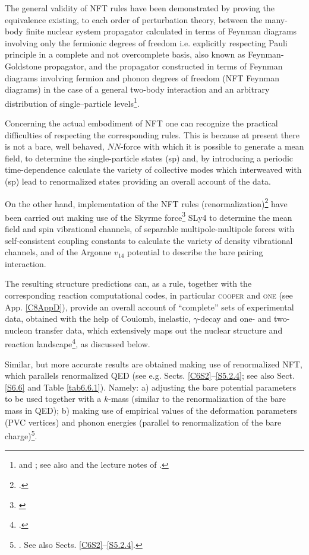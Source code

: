 The general validity of NFT rules have been demonstrated by proving the equivalence existing, to each order of perturbation theory, between the many-body finite nuclear system propagator calculated in terms of Feynman diagrams involving only the fermionic degrees of freedom i.e. explicitly respecting Pauli principle in a complete and not overcomplete basis, also known as Feynman-Goldstone propagator, and the propagator constructed in terms of Feynman diagrams involving fermion and phonon degrees of freedom (NFT Feynman diagrams) in the case of a general two-body interaction and an arbitrary distribution of single--particle levels\footnote{\cite{Bes:75} and \cite{Bes:76c}; see also \cite{Baranger:69} and the  lecture notes of  \cite{McFarlane:69}.}.



 Concerning the actual embodiment of NFT one can recognize the practical difficulties of respecting the corresponding rules. This is because at present there is not a  bare, well behaved, $NN$-force  with which it is possible to generate a mean field,  to determine the single-particle states (sp)  and, by introducing a periodic time-dependence calculate the variety of collective modes which interweaved with (sp) lead to renormalized states providing an overall account of the data. 



On the other hand,  implementation of the NFT rules (renormalization)\footnote{\cite{Broglia:16}.} have been carried out making use of the Skyrme  force\footnote{\cite{Chabanat:97}} SLy4 to determine the mean field and spin vibrational channels,  of separable multipole-multipole forces with self-consistent  coupling constants to calculate the variety of density vibrational channels, and of the  Argonne $v_{14}$ potential to describe the bare pairing interaction.


The resulting structure predictions can, as a rule,  together with the corresponding reaction computational codes, in particular \textsc{cooper} and \textsc{one} (see App. \ref{C8AppD}), provide an overall account of ``complete'' sets of experimental data, obtained with the help of Coulomb, inelastic, $\gamma$-decay  and one- and two-nucleon transfer data, which  extensively maps out the nuclear structure and reaction landscape\footnote{\cite{Idini:15,Idini:14,Potel:13}.}, as discussed below.


 Similar, but more accurate results are obtained  making use of renormalized NFT, which parallels renormalized QED (see e.g. Sects. \ref{C6S2}--\ref{S5.2.4}; see also Sect. \ref{S6.6} and Table \ref{tab6.6.1}). Namely: a) adjusting the bare potential parameters to be used together with a $k$-mass (similar to the renormalization of the bare mass in QED); b) making use of empirical values of the deformation parameters (PVC vertices) and phonon energies (parallel to renormalization of the bare charge)\footnote{\cite{Barranco:17,Barranco:20}. See also Sects. \ref{C6S2}--\ref{S5.2.4}.}.
